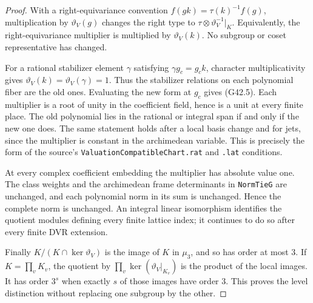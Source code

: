 \begin{proof}
With a right-equivariance convention
$f(gk)=\tau(k)^{-1}f(g)$, multiplication by
$\vartheta_V(g)$ changes the right type to
$\tau\otimes\vartheta_V^{-1}|_K$.  Equivalently, the
right-equivariance multiplier is multiplied by
$\vartheta_V(k)$.  No subgroup or coset representative
has changed.

For a rational stabilizer element $\gamma$ satisfying
$\gamma g_c=g_c k$, character multiplicativity gives
$\vartheta_V(k)=\vartheta_V(\gamma)=1$.  Thus the
stabilizer relations on each polynomial fiber are
the old ones.  Evaluating the new form at $g_c$ gives
(G42.5).  Each multiplier is a root of unity in the
coefficient field, hence is a unit at every finite
place.  The old polynomial lies in the rational or
integral span if and only if the new one does.  The
same statement holds after a local basis change and
for jets, since the multiplier is constant in the
archimedean variable.  This is precisely the form of
the source's \texttt{ValuationCompatibleChart.rat}
and \texttt{.lat} conditions.

At every complex coefficient embedding the multiplier
has absolute value one.  The class weights and the
archimedean frame determinants in \texttt{NormTieG}
are unchanged, and each polynomial norm in its sum
is unchanged.  Hence the complete norm is unchanged.
An integral linear isomorphism identifies the quotient
modules defining every finite lattice index; it
continues to do so after every finite DVR extension.

Finally $K/(K\cap\ker\vartheta_V)$ is the image of
$K$ in $\mu_3$, and so has order at most $3$.  If
$K=\prod_v K_v$, the quotient by $\prod_v\ker
(\vartheta_V|_{K_v})$ is the product of the local
images.  It has order $3^s$ when exactly $s$ of those
images have order $3$.  This proves the level
distinction without replacing one subgroup by the other.
\end{proof}

